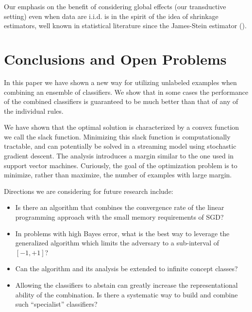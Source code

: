 \documentclass{colt2015} %
\begin{document}
Our emphasis on the benefit of considering global effects (our transductive setting) even when data are i.i.d. 
is in the spirit of the idea of shrinkage estimators, well known in statistical literature since the James-Stein estimator (\cite{EM77}).



\section{Conclusions and Open Problems}
\label{sec:openproblems}

In this paper we have shown a new way for utilizing unlabeled examples
when combining an ensemble of classifiers. We show that in some cases
the performance of the combined classifiers is guaranteed to be much
better than that of any of the individual rules.

We have shown that the optimal solution is characterized by a convex
function we call the slack function. Minimizing this slack function is
computationally tractable, and can potentially be solved in a streaming
model using stochastic gradient descent. The analysis introduces a
margin similar to the one used in support vector machines. Curiously,
the goal of the optimization problem is to minimize, rather than
maximize, the number of examples with large margin.

Directions we are considering for future research include:
\begin{itemize}
\item Is there an algorithm that combines the convergence rate of the
  linear programming approach with the small memory requirements of
  SGD?
\item In problems with high Bayes error, what is the best way to
  leverage the generalized algorithm which limits the adversary to
  a sub-interval of $[-1,+1]$?
\item Can the algorithm and its analysis be extended to infinite
  concept classes?
\item Allowing the classifiers to abstain can greatly increase the
  representational ability of the combination. Is there a systematic
  way to build and combine such ``specialist'' classifiers?
\end{itemize}
\end{document}
